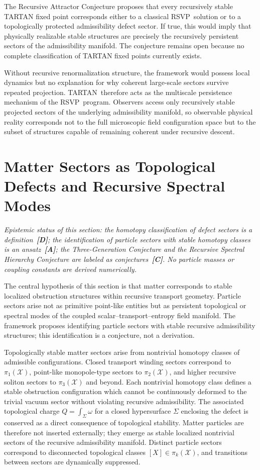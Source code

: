\documentclass[12pt,a4paper]{article}
\newcommand{\RSVP}{\textrm{RSVP}}
\newcommand{\TARTAN}{\textrm{TARTAN}}
\newcommand{\Field}{\mathcal{X}}
\begin{document}
The Recursive Attractor Conjecture proposes that every recursively
stable TARTAN fixed point corresponds either to a classical \RSVP\ solution or
to a topologically protected admissibility defect sector. If true, this would
imply that physically realizable stable structures are precisely the recursively
persistent sectors of the admissibility manifold. The conjecture remains open
because no complete classification of TARTAN fixed points currently exists.

Without recursive renormalization structure, the framework would possess local
dynamics but no explanation for why coherent large-scale sectors survive
repeated projection. \TARTAN\ therefore acts as the multiscale persistence
mechanism of the \RSVP\ program. Observers access only recursively stable
projected sectors of the underlying admissibility manifold, so observable
physical reality corresponds not to the full microscopic field configuration
space but to the subset of structures capable of remaining coherent under
recursive descent.

\section{Matter Sectors as Topological Defects and Recursive Spectral Modes}

\emph{Epistemic status of this section: the homotopy classification of defect
sectors is a definition~\textbf{[D]}; the identification of particle sectors with
stable homotopy classes is an ansatz~\textbf{[A]}; the Three-Generation Conjecture
and the Recursive Spectral Hierarchy Conjecture are labeled as conjectures~\textbf{[C]}.
No particle masses or coupling constants are derived numerically.}

The central hypothesis of this section is that matter corresponds to stable
localized obstruction structures within recursive transport geometry. Particle
sectors arise not as primitive point-like entities but as persistent topological
or spectral modes of the coupled scalar--transport--entropy field manifold. The
framework proposes identifying particle sectors with stable recursive
admissibility structures; this identification is a conjecture, not a derivation.

Topologically stable matter sectors arise from nontrivial homotopy classes of
admissible configurations. Closed transport winding sectors correspond to
$\pi_1(\Field)$, point-like monopole-type sectors to $\pi_2(\Field)$, and
higher recursive soliton sectors to $\pi_3(\Field)$ and beyond. Each nontrivial
homotopy class defines a stable obstruction configuration which cannot be
continuously deformed to the trivial vacuum sector without violating recursive
admissibility. The associated topological charge
$Q=\int_\Sigma\omega$ for a closed hypersurface $\Sigma$ enclosing the defect
is conserved as a direct consequence of topological stability. Matter particles
are therefore not inserted externally; they emerge as stable localized
nontrivial sectors of the recursive admissibility manifold. Distinct particle
sectors correspond to disconnected topological classes $[X]\in\pi_k(\Field)$,
and transitions between sectors are dynamically suppressed.
\end{document}
